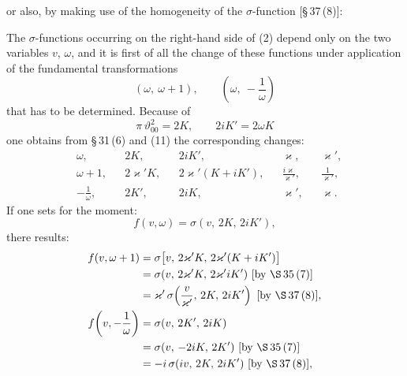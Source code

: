 

or also, by making use of the homogeneity of the $\sigma$-function [\S\,37\,(8)]:


The $\sigma$-functions occurring on the right-hand side of (2) depend only on the two variables $v$, $\omega$, and it is first of all the change of these functions under application of the fundamental transformations
\[
(\omega,\ \omega+1), \qquad \left(\omega,\ -\frac{1}{\omega}\right)
\]
that has to be determined. Because of
\[
\pi\,\vartheta_{00}^{2}=2K, \qquad 2iK'=2\omega K
\]
one obtains from \S\,31\,(6) and (11) the corresponding changes:
\[
\begin{aligned}
&\omega, && 2K, && 2iK', && \varkappa, && \varkappa',\\
&\omega+1, && 2\varkappa'K, && 2\varkappa'(K+iK'), && \frac{i\varkappa}{\varkappa'}, && \frac{1}{\varkappa'},\\
&-\frac{1}{\omega}, && 2K', && 2iK, && \varkappa', && \varkappa.
\end{aligned}
\]
If one sets for the moment:
\[
f(v,\omega)=\sigma(v,\,2K,\,2iK'),
\]
there results:
\[
\begin{aligned}
f(v,\omega+1)&=\sigma\bigl[v,\,2\varkappa'K,\,2\varkappa'(K+iK')\bigr]\\
&=\sigma(v,\,2\varkappa'K,\,2\varkappa'iK')\ \text{[by \S\,35\,(7)]}\\
&=\varkappa'\,\sigma\!\left(\frac{v}{\varkappa'},\,2K,\,2iK'\right)\ \text{[by \S\,37\,(8)]},\\
f\!\left(v,-\frac{1}{\omega}\right)&=\sigma(v,\,2K',\,2iK)\\
&=\sigma(v,\,-2iK,\,2K')\ \text{[by \S\,35\,(7)]}\\
&=-i\,\sigma(iv,\,2K,\,2iK')\ \text{[by \S\,37\,(8)]},
\end{aligned}
\]
